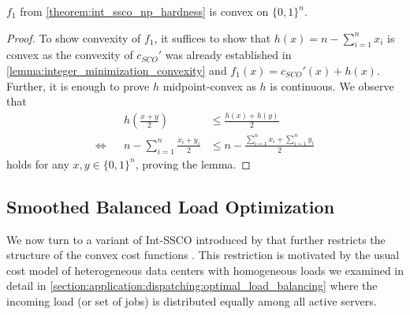 \begin{lemma}
\label{lemma:ssco_reduction_convexity}
$f_1$ from \autoref{theorem:int_ssco_np_hardness} is convex on $\{0,1\}^n$.
\end{lemma}
\begin{proof}
To show convexity of $f_1$, it suffices to show that $h(x) = n - \sum_{i=1}^n x_i$ is convex as the convexity of $c_{SCO}'$ was already established in \autoref{lemma:integer_minimization_convexity} and $f_1(x) = c_{SCO}'(x) + h(x)$. Further, it is enough to prove $h$ midpoint-convex as $h$ is continuous. We observe that \begin{align*}
         &&h\left(\frac{x + y}{2}\right) &\leq \frac{h(x) + h(y)}{2} \\
    \iff &&n - \sum_{i=1}^n \frac{x_i + y_i}{2} &\leq n - \frac{\sum_{i=1}^n x_i + \sum_{i=1}^n y_i}{2}
\end{align*} holds for any $x, y \in \{0,1\}^n$, proving the lemma.
\end{proof}

\subsection{Smoothed Balanced Load Optimization}

We now turn to a variant of Int-SSCO introduced by \citeauthor*{Albers2021_2} that further restricts the structure of the convex cost functions \cite{Albers2021_2}. This restriction is motivated by the usual cost model of heterogeneous data centers with homogeneous loads we examined in detail in \autoref{section:application:dispatching:optimal_load_balancing} where the incoming load (or set of jobs) is distributed equally among all active servers.


